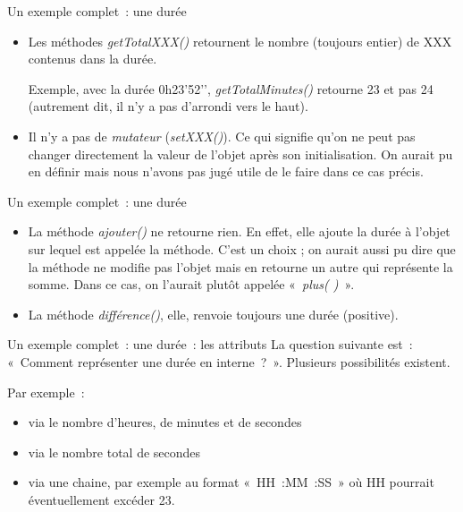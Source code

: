 \begin{frame}{Un exemple complet~: une durée}
	\begin{itemize}
			\item {
				Les méthodes \textit{getTotalXXX()} retournent le nombre
				(toujours entier) de XXX contenus dans la durée. 
				
				Exemple, avec la durée
				0h23’52'’, \textit{getTotalMinutes()}
				retourne 23 et pas 24 (autrement dit, il n’y a pas d’arrondi vers le
				haut).}
			\item {
				Il n’y a pas de \textit{mutateur }(\textit{setXXX()}). Ce qui
				signifie qu’on ne peut pas changer directement la valeur de l’objet
				après son initialisation. On aurait pu en définir mais nous
				n'avons pas jugé utile de le faire dans ce cas
				précis.}
	\end{itemize}
\end{frame}

\begin{frame}{Un exemple complet~: une durée}
	\begin{itemize}
			\item {
				La méthode \textit{ajouter()} ne retourne rien. En effet,
				elle ajoute la durée à l’objet sur lequel est appelée la méthode. C’est
				un choix ; on aurait aussi pu dire que la méthode ne modifie pas
				l’objet mais en retourne un autre qui représente la somme. Dans ce cas,
				on l’aurait plutôt appelée «\textit{~plus( )}~».}
			\item {
				La méthode \textit{différence()}, elle, renvoie toujours une
				durée (positive).}
		\end{itemize}
\end{frame}

\begin{frame}{Un exemple complet~: une durée~: les attributs}
	La question suivante est~: «~Comment représenter une durée en interne~?~». 
	Plusieurs possibilités existent. 
	
	Par exemple~:	
		\begin{itemize}
			\item 
				via le nombre d’heures, de minutes et de secondes
			\item 
				via le nombre total de secondes
			\item 
				via une chaine, par exemple au format «~HH~:MM~:SS~» où HH pourrait
				éventuellement excéder 23.
		\end{itemize}
\end{frame}

